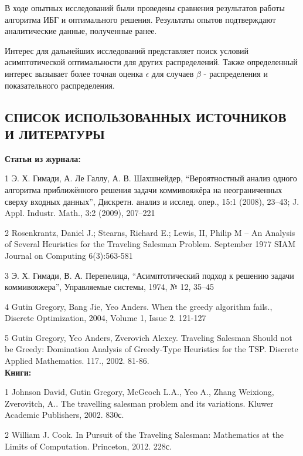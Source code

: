 \documentclass[a4paper, 14pt]{extarticle}
\numberwithin{equation}{section}
\begin{document}
В ходе опытных исследований были проведены сравнения результатов работы алгоритма ИБГ и оптимального решения. Результаты опытов подтверждают аналитические данные, полученные ранее.

Интерес для дальнейших исследований представляет поиск условий асимптотической оптимальности для других распределений. Также определенный интерес вызывает более точная оценка $\epsilon$ для случаев $\beta$ - распределения и показательного распределения.



\newpage

\begin{center}
\chapter{\textbf{СПИСОК ИСПОЛЬЗОВАННЫХ ИСТОЧНИКОВ И ЛИТЕРАТУРЫ}}
\end{center}

\textbf{Статьи из журнала:}

1 Э. Х. Гимади, А. Ле Галлу, А. В. Шахшнейдер, “Вероятностный анализ одного алгоритма приближённого решения задачи коммивояжёра на неограниченных сверху входных данных”, Дискретн. анализ и исслед. опер., 15:1 (2008), 23–43; J. Appl. Industr. Math., 3:2 (2009), 207–221

2 Rosenkrantz, Daniel J.; Stearns, Richard E.; Lewis, II, Philip M -- An Analysis of Several Heuristics for the Traveling Salesman Problem. September 1977 SIAM Journal on Computing 6(3):563-581

3 Э. Х. Гимади, В. А. Перепелица, “Асимптотический подход к решению задачи коммивояжера”, Управляемые системы, 1974, № 12, 35–45

4 Gutin Gregory, Bang Jie, Yeo Anders. When the greedy algorithm fails., Discrete Optimization, 2004, Volume 1, Issue 2. 121-127

5 Gutin Gregory, Yeo Anders, Zverovich Alexey. Traveling Salesman Should not be Greedy: Domination Analysis of Greedy-Type Heuristics for the TSP. Discrete Applied Mathematics. 117., 2002. 81-86.\\


\textbf{Книги:}

1 Johnson David, Gutin Gregory, McGeoch L.A., Yeo A., Zhang Weixiong, Zverovitch, A.. The travelling salesman problem and its variations. Kluwer Academic Publishers, 2002. 830с.

2 William J. Cook. In Pursuit of the Traveling Salesman: Mathematics at the Limits of Computation. Princeton, 2012. 228с.
\end{document}
